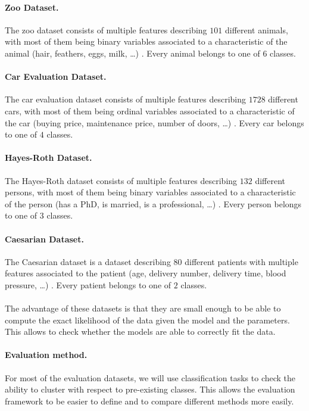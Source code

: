 \paragraph{Zoo Dataset.} The zoo dataset consists of multiple features describing $101$ different animals, with most of them being binary variables associated to a characteristic of the animal (hair, feathers, eggs, milk, \ldots) \citep{misc_zoo_111}. Every animal belongs to one of $6$ classes. 
\paragraph{Car Evaluation Dataset.} The car evaluation dataset consists of multiple features describing $1728$ different cars, with most of them being ordinal variables associated to a characteristic of the car (buying price, maintenance price, number of doors, \ldots) \citep{misc_car_evaluation_19}. Every car belongs to one of $4$ classes.
\paragraph{Hayes-Roth Dataset.} The Hayes-Roth dataset consists of multiple features describing $132$ different persons, with most of them being binary variables associated to a characteristic of the person (has a PhD, is married, is a professional, \ldots) \citep{misc_hayes_roth_44}. Every person belongs to one of $3$ classes.
\paragraph{Caesarian Dataset.} The Caesarian dataset is a dataset describing $80$ different patients with multiple features associated to the patient (age, delivery number, delivery time, blood pressure, \ldots) \citep{misc_caesarian_section_classification_dataset_472}. Every patient belongs to one of $2$ classes. \\ \\
The advantage of these datasets is that they are small enough to be able to compute the exact likelihood of the data given the model and the parameters. This allows to check whether the models are able to correctly fit the data.

\paragraph{Evaluation method.} For most of the evaluation datasets, we will use classification tasks to check the ability to cluster with respect to pre-existing classes. This allows the evaluation framework to be easier to define and to compare different methods more easily. 

